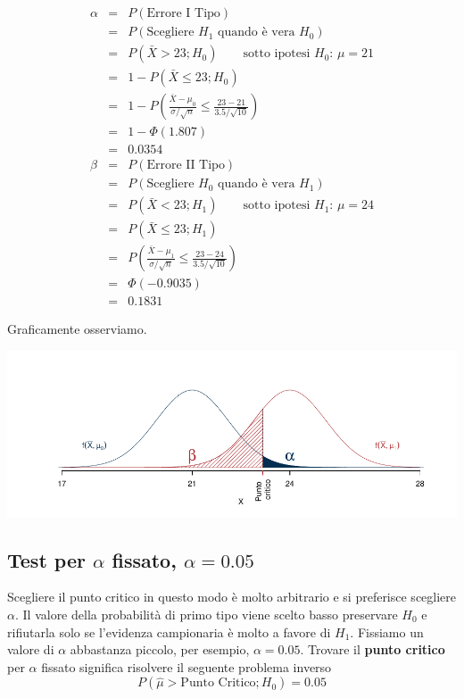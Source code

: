 \documentclass[
  11pt,
]{book}
\theoremstyle{mytheoremstyle}
\theoremstyle{mydefstyle}
\begin{document}
\begin{eqnarray*}
  \alpha &=&  P(\text{Errore I Tipo})\\
  &=& P(\text{Scegliere $H_1$ quando è vera $H_0$})\\
  &=& P(\bar X>23;H_0)\qquad\text{sotto ipotesi $H_0$: $\mu=21$}\\
  &=& 1-P(\bar X \le 23;H_0)\\
  &=& 1-P\left(\frac{\bar X-\mu_0}{\sigma/\sqrt{n}}\le \frac{23-21}{3.5/\sqrt{10}}\right)\\
  &=& 1-\Phi(1.807)\\
  &=& 0.0354\\
  \beta &=&  P(\text{Errore II Tipo})\\
  &=& P(\text{Scegliere $H_0$ quando è vera $H_1$})\\
  &=& P(\bar X<23;H_1)\qquad\text{sotto ipotesi $H_1$: $\mu=24$}\\
  &=& P(\bar X \le 23;H_1)\\
  &=& P\left(\frac{\bar X-\mu_1}{\sigma/\sqrt{n}}\le \frac{23-24}{3.5/\sqrt{10}}\right)\\
  &=& \Phi(-0.9035)\\
  &=& 0.1831
\end{eqnarray*}

Graficamente osserviamo.

\begin{center}\includegraphics{Appunti_di_Statistica_2025_files/figure-latex/14-test-intro-21-1} \end{center}

\subsection{\texorpdfstring{Test per \(\alpha\) fissato, \(\alpha=0.05\)}{Test per \textbackslash alpha fissato, \textbackslash alpha=0.05}}\label{test-per-alpha-fissato-alpha0.05}

Scegliere il punto critico in questo modo è molto arbitrario e si preferisce scegliere \(\alpha\).
Il valore della probabilità di primo tipo viene scelto basso preservare \(H_0\) e rifiutarla solo
se l'evidenza campionaria è molto a favore di \(H_1\).
Fissiamo un valore di \(\alpha\) abbastanza piccolo, per esempio, \(\alpha=0.05\).
Trovare il \textbf{punto critico} per \(\alpha\) fissato significa risolvere il seguente problema inverso
\[P(\hat\mu>\text{Punto Critico};H_0)=0.05\]
\end{document}
